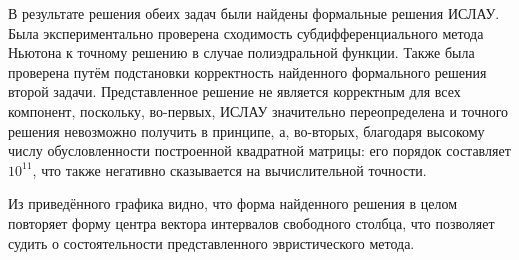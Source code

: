 В результате решения обеих задач были найдены формальные решения ИСЛАУ. Была экспериментально проверена сходимость субдифференциального метода Ньютона к точному решению в случае полиэдральной функции. Также была проверена путём подстановки корректность найденного формального решения второй задачи. Представленное решение не является корректным для всех компонент, поскольку, во-первых, ИСЛАУ значительно переопределена и точного решения невозможно получить в принципе, а, во-вторых, благодаря высокому числу обусловленности построенной квадратной матрицы: его порядок составляет $10^{11}$, что также негативно сказывается на вычислительной точности.

Из приведённого графика видно, что форма найденного решения в целом повторяет форму центра вектора интервалов свободного столбца, что позволяет судить о состоятельности представленного эвристического метода.